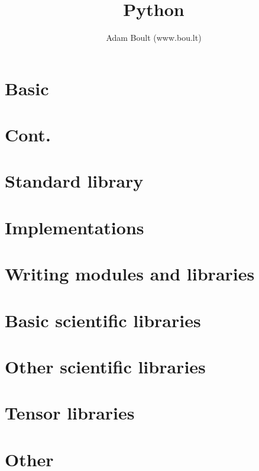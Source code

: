 \documentclass[oneside]{book}
\begin{document}
\author{Adam Boult (www.bou.lt)}
\title{Python}
\maketitle

\setcounter{tocdepth}{0}
\tableofcontents



\part{Basic}








\part{Cont.}





\part{Standard library}










\part{Implementations}


\part{Writing modules and libraries}




\part{Basic scientific libraries}




\part{Other scientific libraries}







\part{Tensor libraries}




\part{Other}

\end{document}
